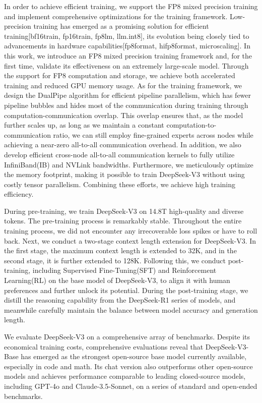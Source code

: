 \documentclass[11pt,a4paper]{article}
\begin{document}
In order to achieve efficient training, we support the FP8 mixed precision training and implement comprehensive optimizations for the training framework.
Low-precision training has emerged as a promising solution for efficient training[bf16train, fp16train, fp8lm, llm.int8], its evolution being closely tied to advancements in hardware capabilities[fp8format, hifp8format, microscaling]. 
In this work, we introduce an FP8 mixed precision training framework and, for the first time, validate its effectiveness on an extremely large-scale model. 
Through the support for FP8 computation and storage, we achieve both accelerated training and reduced GPU memory usage. 
As for the training framework, we design the DualPipe algorithm for efficient pipeline parallelism, which has fewer pipeline bubbles and hides most of the communication during training through computation-communication overlap.
This overlap ensures that, as the model further scales up, as long as we maintain a constant computation-to-communication ratio, we can still employ fine-grained experts across nodes while achieving a near-zero all-to-all communication overhead.
In addition, we also develop efficient cross-node all-to-all communication kernels to fully utilize InfiniBand(IB) and NVLink bandwidths. 
Furthermore, we meticulously optimize the memory footprint, making it possible to train DeepSeek-V3 without using costly tensor parallelism.
Combining these efforts, we achieve high training efficiency.

During pre-training, we train DeepSeek-V3 on 14.8T high-quality and diverse tokens. 
The pre-training process is remarkably stable. 
Throughout the entire training process, we did not encounter any irrecoverable loss spikes or have to roll back.
Next, we conduct a two-stage context length extension for DeepSeek-V3. In the first stage, the maximum context length is extended to 32K, and in the second stage, it is further extended to 128K. 
Following this, we conduct post-training, including Supervised Fine-Tuning(SFT) and Reinforcement Learning(RL) on the base model of DeepSeek-V3, to align it with human preferences and further unlock its potential. 
During the post-training stage, we distill the reasoning capability from the DeepSeek-R1 series of models, and meanwhile carefully maintain the balance between model accuracy and generation length.

We evaluate DeepSeek-V3 on a comprehensive array of benchmarks. 
Despite its economical training costs, comprehensive evaluations reveal that DeepSeek-V3-Base has emerged as the strongest open-source base model currently available, especially in code and math. 
Its chat version also outperforms other open-source models and achieves performance comparable to leading closed-source models, including GPT-4o and Claude-3.5-Sonnet, on a series of standard and open-ended benchmarks.
\end{document}
